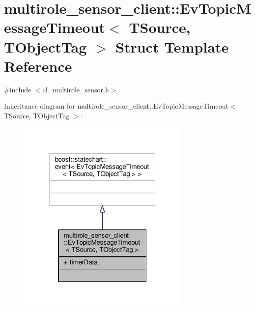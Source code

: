 \hypertarget{structmultirole__sensor__client_1_1EvTopicMessageTimeout}{}\section{multirole\+\_\+sensor\+\_\+client\+:\+:Ev\+Topic\+Message\+Timeout$<$ T\+Source, T\+Object\+Tag $>$ Struct Template Reference}
\label{structmultirole__sensor__client_1_1EvTopicMessageTimeout}


{\ttfamily \#include $<$cl\+\_\+multirole\+\_\+sensor.\+h$>$}



Inheritance diagram for multirole\+\_\+sensor\+\_\+client\+:\+:Ev\+Topic\+Message\+Timeout$<$ T\+Source, T\+Object\+Tag $>$\+:\nopagebreak
\begin{figure}[H]
\begin{center}
\leavevmode
\includegraphics[width=241pt]{structmultirole__sensor__client_1_1EvTopicMessageTimeout__inherit__graph}
\end{center}
\end{figure}


